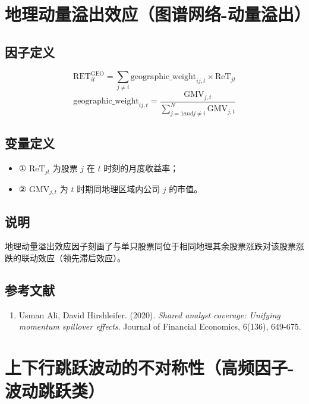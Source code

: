 \documentclass{article}
\begin{document}
\section{地理动量溢出效应（图谱网络-动量溢出）}

\subsection{因子定义}
\begin{equation}
    \mathrm{RET}_{it}^{\mathrm{GEO}} = \sum_{j \neq i} \mathrm{geographic\_weight}_{ij,t} \times \mathrm{Re T}_{jt}
\end{equation}
\begin{equation}
    \mathrm{geographic\_weight}_{ij,t} = \frac{\mathrm{GMV}_{j,t}}{\sum_{j=1 and j \neq i}^N \mathrm{GMV}_{j,t}}
\end{equation}

\subsection{变量定义}
\begin{itemize}
    \item ① \( \mathrm{ReT}_{jt} \) 为股票 \( j \) 在 \( t \) 时刻的月度收益率；
    \item ② \( \mathrm{GMV}_{j,t} \) 为 \( t \) 时期同地理区域内公司 \( j \) 的市值。
\end{itemize}

\subsection{说明}
地理动量溢出效应因子刻画了与单只股票同位于相同地理其余股票涨跌对该股票涨跌的联动效应（领先滞后效应）。

\subsection{参考文献}
\begin{enumerate}
    \item Usman Ali, David Hirshleifer. (2020). \textit{Shared analyst coverage: Unifying momentum spillover effects}. Journal of Financial Economics, 6(136), 649-675.
\end{enumerate}

\section{上下行跳跃波动的不对称性（高频因子-波动跳跃类）}
\end{document}
